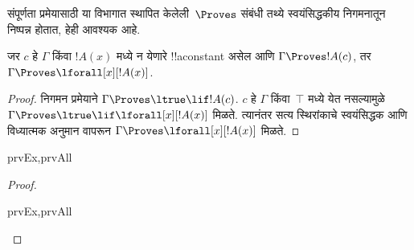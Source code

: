 \documentclass[../../../include/open-logic-section]{subfiles}
\begin{document}


\begin{explain}
  संपूर्णता प्रमेयासाठी या विभागात स्थापित केलेली~$\Proves$ संबंधी तथ्ये
  स्वयंसिद्धकीय निगमनातून निष्पन्न होतात, हेही आवश्यक आहे.
\end{explain}

\begin{thm}
 जर $c$ हे $\Gamma$ किंवा $!A(x)$ मध्ये
न येणारे !!a{constant} असेल आणि $\Gamma \Proves !A(c)$, तर $\Gamma
\Proves \lforall[x][!A(x)]$.
\end{thm}

\begin{proof}
निगमन प्रमेयाने $\Gamma \Proves \ltrue \lif !A(c)$. $c$ हे
$\Gamma$ किंवा~$\top$ मध्ये येत नसल्यामुळे $\Gamma \Proves
\ltrue \lif \lforall[x][!A(x)]$ मिळते. त्यानंतर सत्य स्थिरांकाचे
स्वयंसिद्धक आणि विध्यात्मक अनुमान वापरून $\Gamma \Proves
\lforall[x][!A(x)]$ मिळते.
\end{proof}

\begin{prop}
\begin{tagenumerate}{prvEx,prvAll}

\end{tagenumerate}
\end{prop}

\begin{proof}
\begin{tagenumerate}{prvEx,prvAll}
\end{tagenumerate}
\end{proof}
\end{document}
